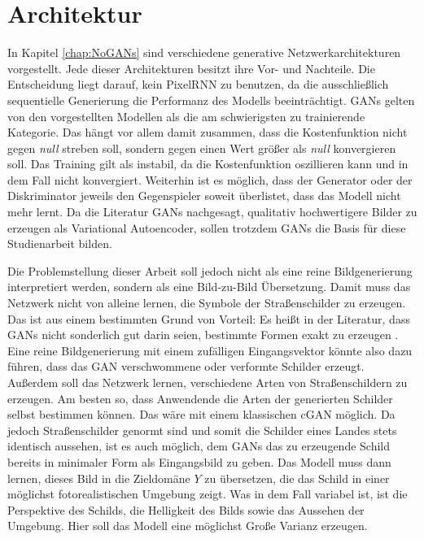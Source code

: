 \section{Architektur}
\label{chap:3-architektur}
In Kapitel \ref{chap:NoGANs} sind verschiedene generative Netzwerkarchitekturen vorgestellt. Jede dieser Architekturen besitzt ihre Vor- und Nachteile. Die Entscheidung liegt darauf, kein \ac{PixelRNN} zu benutzen, da die ausschließlich sequentielle Generierung die Performanz des Modells beeinträchtigt. \acp{GAN} gelten von den vorgestellten Modellen als die am schwierigsten zu trainierende Kategorie. Das hängt vor allem damit zusammen, dass die Kostenfunktion nicht gegen \emph{null} streben soll, sondern gegen einen Wert größer als \emph{null} konvergieren soll. Das Training gilt als instabil, da die Kostenfunktion oszillieren kann und in dem Fall nicht konvergiert. Weiterhin ist es möglich, dass der Generator oder der Diskriminator jeweils den Gegenspieler soweit überlistet, dass das Modell nicht mehr lernt. Da die Literatur \acp{GAN} nachgesagt, qualitativ hochwertigere Bilder zu erzeugen als Variational Autoencoder, sollen trotzdem \acp{GAN} die Basis für diese Studienarbeit bilden. \cite{generativeModelsSurvey} \cite{generative-models-comparison}

Die Problemstellung dieser Arbeit soll jedoch nicht als eine reine Bildgenerierung interpretiert werden, sondern als eine Bild-zu-Bild Übersetzung. Damit muss das Netzwerk nicht von alleine lernen, die Symbole der Straßenschilder zu erzeugen. Das ist aus einem bestimmten Grund von Vorteil: Es heißt in der Literatur, dass \acp{GAN} nicht sonderlich gut darin seien, bestimmte Formen exakt zu erzeugen \cite{generativeModelsSurvey}. Eine reine Bildgenerierung mit einem zufälligen Eingangsvektor könnte also dazu führen, dass das \ac{GAN} verschwommene oder verformte Schilder erzeugt. Außerdem soll das Netzwerk lernen, verschiedene Arten von Straßenschildern zu erzeugen. Am besten so, dass Anwendende die Arten der generierten Schilder selbst bestimmen können. Das wäre mit einem klassischen \ac{cGAN} möglich. Da jedoch Straßenschilder genormt sind und somit die Schilder eines Landes stets identisch aussehen, ist es auch möglich, dem \acp{GAN} das zu erzeugende Schild bereits in minimaler Form als Eingangsbild zu geben. Das Modell muss dann lernen, dieses Bild in die Zieldomäne $Y$ zu übersetzen, die das Schild in einer möglichst fotorealistischen Umgebung zeigt. Was in dem Fall variabel ist, ist die Perspektive des Schilds, die Helligkeit des Bilds sowie das Aussehen der Umgebung. Hier soll das Modell eine möglichst Große Varianz erzeugen.

